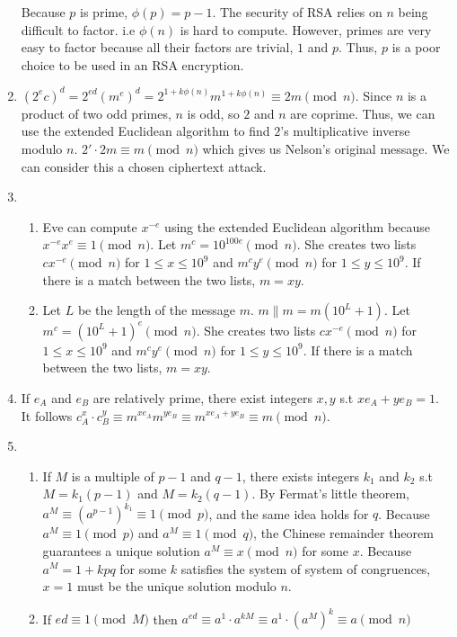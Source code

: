 \documentclass[10pt]{article}
\begin{document}
\begin{enumerate}[label= \arabic*.]
    Because $p$ is prime, $\phi(p)=p-1$. 
    The security of RSA relies on $n$ being difficult to factor. i.e $\phi(n)$ is hard to compute.
    However, primes are very easy to factor because all their factors are trivial, $1$ and $p$.
    Thus, $p$ is a poor choice to be used in an RSA encryption.
    \item ${(2^e c)}^d=2^{ed}{(m^e)}^{d}=2^{1+k\phi(n)}m^{1+k\phi(n)}\equiv 2m\pmod{n}$.
    Since $n$ is a product of two odd primes, $n$ is odd, so $2$ and $n$ are coprime. 
    Thus, we can use the extended Euclidean algorithm to find $2$'s multiplicative inverse modulo $n$.
    $2'\cdot 2m\equiv m\pmod{n}$ which gives us Nelson's original message.
    We can consider this a chosen ciphertext attack.
    \item \begin{enumerate}
        \item Eve can compute $x^{-e}$ using the extended Euclidean algorithm because $x^{-e}x^e\equiv 1\pmod{n}$.
         Let $m^c=10^{100e}\pmod{n}$. 
        She creates two lists $cx^{-e}\pmod{n}$ for $1\le x\le 10^9$ and $m^c y^e\pmod{n}$ for $1\le y\le 10^9$.
        If there is a match between the two lists, $m=xy$.
        \item Let $L$ be the length of the message $m$. 
        $m\lVert m=m(10^L+1)$.
        Let $m^c={(10^L+1)}^e\pmod{n}$. 
        She creates two lists $cx^{-e}\pmod{n}$ for $1\le x\le 10^9$ and $m^c y^e\pmod{n}$ for $1\le y\le 10^9$.
        If there is a match between the two lists, $m=xy$.
    \end{enumerate}
    \item If $e_A$ and $e_B$ are relatively prime, there exist integers $x,y$ s.t $xe_A+ye_B=1$. 
    It follows $c_A^x\cdot c_B^y\equiv m^{xe_A}m^{ye_B}\equiv m^{xe_A+ye_B}\equiv m\pmod{n}$.
    \item \begin{enumerate}
        \item If $M$ is a multiple of $p-1$ and $q-1$, there exists integers $k_1$ and $k_2$ s.t $M=k_1(p-1)$ and $M=k_2(q-1)$. 
        By Fermat's little theorem, $a^M\equiv {(a^{p-1})}^{k_1}\equiv 1\pmod{p}$, and the same idea holds for $q$.
        Because $a^M\equiv 1\pmod{p}$ and $a^M\equiv 1\pmod{q}$, the Chinese remainder theorem guarantees a unique solution $a^M\equiv x\pmod{n}$ for some $x$. 
        Because $a^M=1+kpq$ for some $k$ satisfies the system of system of congruences, $x=1$ must be the unique solution modulo $n$. 
        \item If $ed\equiv 1\pmod{M}$ then $a^{ed}\equiv a^{1}\cdot a^{kM}\equiv a^1\cdot {(a^M)}^k\equiv a\pmod{n}$

\end{enumerate}
\end{enumerate}
\end{document}
